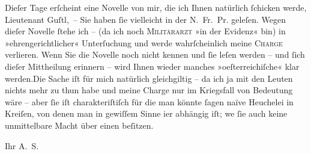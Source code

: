 \pstart
           \noindent{}{\pb}Dieſer Tage erſcheint eine Novelle von mir,
                  die ich Ihnen natürlich{ }ſchicken werde, Lieutenant
                     Guſtl, – Sie haben{ }ſie vielleicht in der N. Fr. Pr. geleſen. Wegen dieſer Novelle{ }ſtehe ich – (da ich noch \textsc{Militärarzt} »in der Evidenz« bin) in »ehrengerichtlicher«
                  Unterſuchung und werde wahrſcheinlich meine \textsc{Charge}
                  verlieren. Wenn Sie die Novelle {\pb}noch nicht
                  kennen und{ }ſie leſen werden – und{ }ſich dieſer Mittheilung erinnern – wird Ihnen
                  wieder manches »oeſterreichiſche« klar
                     werden.\hspace*{1.5em}Die Sache iſt für mich natürlich
                  gleichgiltig – da ich ja mit den Leuten nichts mehr zu thun habe und meine Charge
                  nur im Kriegsfall von Bedeutung wäre – aber{ }ſie iſt charakteriſtiſch für {\pb}die man könnte{ }ſagen naïve Heuchelei in
                  Kreiſen, von denen man in gewiſſem Sinne i{\geminationm}er
                  abhängig iſt; we{\geminationn}{ }ſie auch keine unmittelbare Macht über einen
                  beſitzen.\pend
           
\pstart
           Ihr \spacefill\mbox{A. S.}\pend
           \endnumbering{}  \newcommand{\dateiname}{L01114}\newcommand{\titel}{Arthur Schnitzler an Georg Brandes, 25. 4. 1901}\newcommand{\editorInnen}{Martin Anton Müller und Gerd-Hermann Susen}
